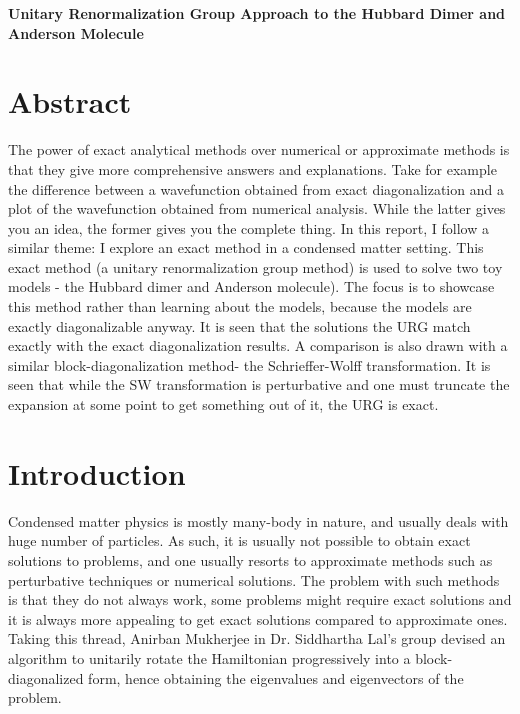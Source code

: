 \documentclass[12pt]{article}
\begin{document}
\begin{titlepage}
\begin{center}
	\vspace{10pt}
\bf{\Huge{Unitary Renormalization Group Approach to the Hubbard Dimer and Anderson Molecule}}\\
	\vspace{50pt}
\end{center}

\end{titlepage}

\section*{Abstract}
The power of exact analytical methods over numerical or approximate methods is that they give more comprehensive answers and explanations. Take for example the difference between a wavefunction obtained from exact diagonalization and a plot of the wavefunction obtained from numerical analysis. While the latter gives you an idea, the former gives you the complete thing. In this report, I follow a similar theme: I explore an exact method in a condensed matter setting. This exact method (a unitary renormalization group method) is used to solve two toy models - the Hubbard dimer and Anderson molecule). The focus is to showcase this method rather than learning about the models, because the models are exactly diagonalizable anyway. It is seen that the solutions the URG match exactly with the exact diagonalization results. A comparison is also drawn with a similar block-diagonalization method- the Schrieffer-Wolff transformation. It is seen that while the SW transformation is perturbative and one must truncate the expansion at some point to get something out of it, the URG is exact.
\newpage

\tableofcontents

\newpage
\section{Introduction}
Condensed matter physics is mostly many-body in nature, and usually deals with huge number of particles. As such, it is usually not possible to obtain exact solutions to problems, and one usually resorts to approximate methods such as perturbative techniques or numerical solutions. The problem with such methods is that they do not always work, some problems might require exact solutions and it is always more appealing to get exact solutions compared to approximate ones. Taking this thread, Anirban Mukherjee in Dr. Siddhartha Lal's group devised an algorithm to unitarily rotate the Hamiltonian progressively into a block-diagonalized form, hence obtaining the eigenvalues and eigenvectors of the problem.
\end{document}
